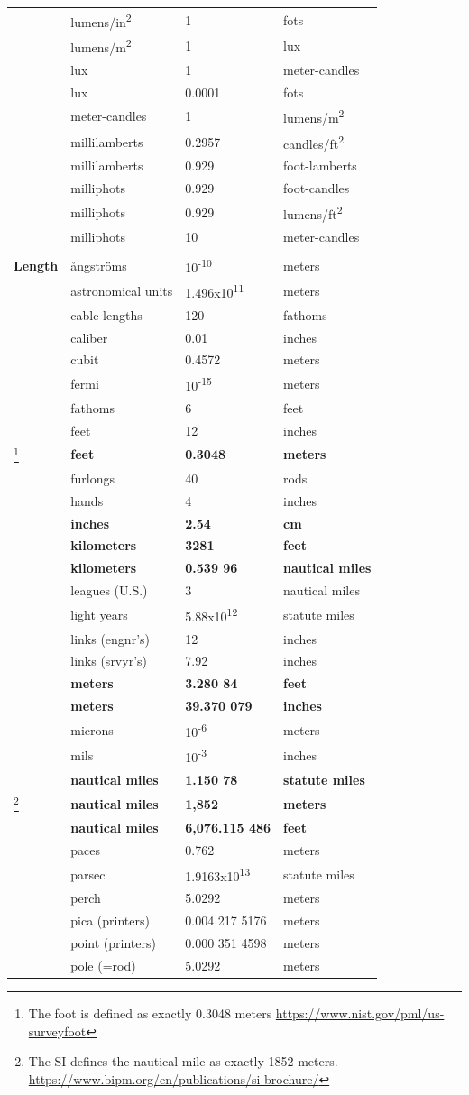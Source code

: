 \documentclass[
]{book}
\begin{document}
\begin{longtable}[]{@{}llll@{}}
& lumens/in\textsuperscript{2} & 1 & fots\tabularnewline
& lumens/m\textsuperscript{2} & 1 & lux\tabularnewline
& lux & 1 & meter-candles\tabularnewline
& lux & 0.0001 & fots\tabularnewline
& meter-candles & 1 & lumens/m\textsuperscript{2}\tabularnewline
& millilamberts & 0.2957 & candles/ft\textsuperscript{2}\tabularnewline
& millilamberts & 0.929 & foot-lamberts\tabularnewline
& milliphots & 0.929 & foot-candles\tabularnewline
& milliphots & 0.929 & lumens/ft\textsuperscript{2}\tabularnewline
& milliphots & 10 & meter-candles\tabularnewline
& & &\tabularnewline
\textbf{Length} & ångströms & 10\textsuperscript{-10} & meters\tabularnewline
& astronomical units & 1.496x10\textsuperscript{11} & meters\tabularnewline
& cable lengths & 120 & fathoms\tabularnewline
& caliber & 0.01 & inches\tabularnewline
& cubit & 0.4572 & meters\tabularnewline
& fermi & 10\textsuperscript{-15} & meters\tabularnewline
& fathoms & 6 & feet\tabularnewline
& feet & 12 & inches\tabularnewline
\footnote{The foot is defined as exactly 0.3048 meters \url{https://www.nist.gov/pml/us-surveyfoot}} & \textbf{feet} & \textbf{0.3048} & \textbf{meters}\tabularnewline
& furlongs & 40 & rods\tabularnewline
& hands & 4 & inches\tabularnewline
& \textbf{inches} & \textbf{2.54} & \textbf{cm}\tabularnewline
& \textbf{kilometers} & \textbf{3281} & \textbf{feet}\tabularnewline
& \textbf{kilometers} & \textbf{0.539 96} & \textbf{nautical miles}\tabularnewline
& leagues (U.S.) & 3 & nautical miles\tabularnewline
& light years & 5.88x10\textsuperscript{12} & statute miles\tabularnewline
& links (engnr's) & 12 & inches\tabularnewline
& links (srvyr's) & 7.92 & inches\tabularnewline
& \textbf{meters} & \textbf{3.280 84} & \textbf{feet}\tabularnewline
& \textbf{meters} & \textbf{39.370 079} & \textbf{inches}\tabularnewline
& microns & 10\textsuperscript{-6} & meters\tabularnewline
& mils & 10\textsuperscript{-3} & inches\tabularnewline
& \textbf{nautical miles} & \textbf{1.150 78} & \textbf{statute miles}\tabularnewline
\footnote{The SI defines the nautical mile as exactly 1852 meters. \url{https://www.bipm.org/en/publications/si-brochure/}} & \textbf{nautical miles} & \textbf{1,852} & \textbf{meters}\tabularnewline
& \textbf{nautical miles} & \textbf{6,076.115 486} & \textbf{feet}\tabularnewline
& paces & 0.762 & meters\tabularnewline
& parsec & 1.9163x10\textsuperscript{13} & statute miles\tabularnewline
& perch & 5.0292 & meters\tabularnewline
& pica (printers) & 0.004 217 5176 & meters\tabularnewline
& point (printers) & 0.000 351 4598 & meters\tabularnewline
& pole (=rod) & 5.0292 & meters\tabularnewline

\end{longtable}
\end{document}
